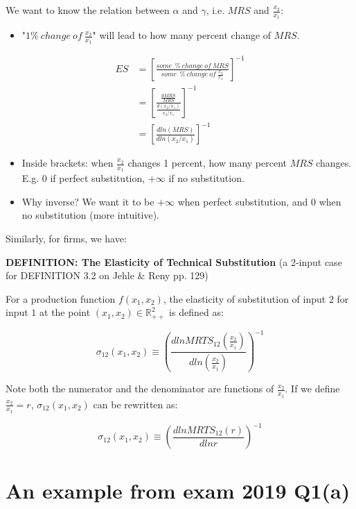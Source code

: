 \documentclass{article}
\newcommand{\R}{\mathbb{R}}
\begin{document}
\begin{mdframed}[backgroundcolor=blue!20,linecolor=white]
We want to know the relation between $\alpha$ and $\gamma$, i.e. $MRS$ and $\frac{x_2}{x_1}$:
\begin{itemize}
\item "$1\% \ change \ of \ \frac{x_2}{x_1} $" will lead to how many percent change of $MRS$.
\end{itemize}

\begin{align*}
ES &= [\frac{some \ \ \% \ change \  of \ MRS}{some \  \ \% \ change \ of \ \frac{x_2}{x_1}}]^{-1} \\
&= [\frac{\frac{d MRS}{MRS}}{\frac{d(x_2/x_1)}{x_2/x_1}}]^{-1} \\
&= [\frac{d ln(MRS)}{d ln(x_2/x_1)}]^{-1}
\end{align*}

\begin{itemize}
\item Inside brackets: when $\frac{x_2}{x_1}$ changes 1 percent, how many percent $MRS$ changes. E.g. $0$ if perfect substitution, $+\infty$ if no substitution.
\item Why inverse? We want it to be $+\infty$ when perfect substitution, and $0$ when no substitution (more intuitive).
\end{itemize}

Similarly, for firms, we have:

\textbf{DEFINITION: The Elasticity of Technical Substitution} (a 2-input case for DEFINITION 3.2 on Jehle \& Reny pp. 129)

\vspace{2mm}

For a production function $f(x_1,x_2)$, the elasticity of substitution of input $2$ for input $1$ at the
point $(x_1,x_2) \in \R^2_{++}$ is defined as:

$$\sigma_{12}(x_1,x_2) \equiv (\frac{d ln MRTS_{12}(\frac{x_2}{x_1})}{dln (\frac{x_2}{x_1})})^{-1}$$

Note both the numerator and the denominator are functions of $\frac{x_2}{x_1}$. If we define $\frac{x_2}{x_1} = r$,
$\sigma_{12}(x_1,x_2)$ can be rewritten as:

$$\sigma_{12}(x_1,x_2) \equiv (\frac{d ln MRTS_{12}(r)}{dln r})^{-1}$$

\end{mdframed}


\section{An example from exam 2019 Q1(a)}
\end{document}
